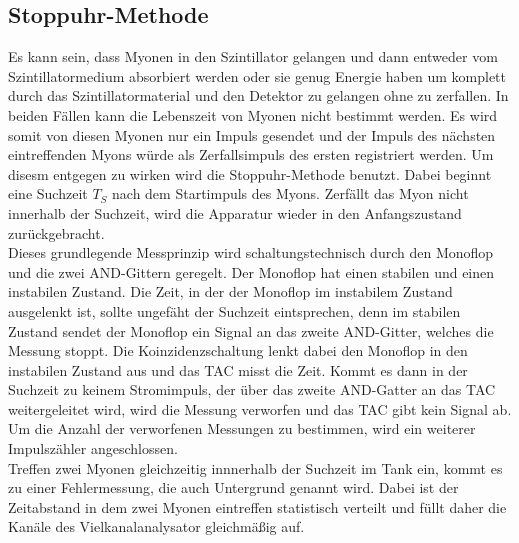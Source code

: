 \subsection{Stoppuhr-Methode}
\label{subsec:Messmethode}
Es kann sein, dass Myonen in den Szintillator gelangen und dann entweder vom Szintillatormedium absorbiert werden oder sie genug 
Energie haben um komplett durch das Szintillatormaterial und den Detektor zu gelangen ohne zu zerfallen.
In beiden Fällen kann die Lebenszeit von Myonen nicht bestimmt werden.
Es wird somit von diesen Myonen nur ein Impuls gesendet und der Impuls des nächsten eintreffenden Myons würde als Zerfallsimpuls des ersten
registriert werden. Um disesm entgegen zu wirken
wird die Stoppuhr-Methode benutzt. Dabei beginnt eine Suchzeit $T_S$ nach dem Startimpuls des Myons. Zerfällt das Myon nicht innerhalb der Suchzeit,
wird die Apparatur wieder in den Anfangszustand zurückgebracht.\\
Dieses grundlegende Messprinzip wird schaltungstechnisch durch den Monoflop und die zwei AND-Gittern geregelt.
Der Monoflop hat einen stabilen und einen instabilen Zustand.
Die Zeit, in der der Monoflop im instabilem Zustand ausgelenkt ist, sollte ungefäht der Suchzeit eintsprechen, denn im stabilen Zustand sendet
der Monoflop ein Signal an das zweite AND-Gitter, welches die Messung stoppt.
Die Koinzidenzschaltung lenkt dabei den Monoflop in den instabilen Zustand aus und das TAC misst die Zeit. Kommt es dann in der Suchzeit zu keinem
Stromimpuls, der über das zweite AND-Gatter an das TAC weitergeleitet wird, wird die Messung verworfen und das TAC gibt kein Signal ab.
Um die Anzahl der verworfenen Messungen zu bestimmen, wird ein weiterer Impulszähler angeschlossen.\\
Treffen zwei Myonen gleichzeitig innnerhalb der Suchzeit im Tank ein, kommt es zu einer Fehlermessung, die auch Untergrund genannt wird.
Dabei ist der Zeitabstand in dem zwei Myonen eintreffen statistisch verteilt und füllt daher die Kanäle des Vielkanalanalysator gleichmäßig auf.

